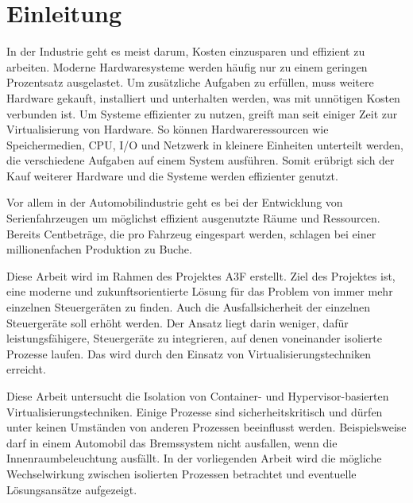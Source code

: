 \thispagestyle{empty}
\section{Einleitung}
In der Industrie geht es meist darum, Kosten einzusparen und effizient zu arbeiten. Moderne Hardwaresysteme werden häufig nur zu einem geringen Prozentsatz ausgelastet. Um zusätzliche Aufgaben zu erfüllen, muss weitere Hardware gekauft, installiert und unterhalten werden, was mit unnötigen Kosten verbunden ist. Um Systeme effizienter zu nutzen, greift man seit einiger Zeit zur Virtualisierung von Hardware. So können Hardwareressourcen wie Speichermedien, \ac{CPU}, \ac{I/O} und Netzwerk in kleinere Einheiten unterteilt werden, die verschiedene Aufgaben auf einem System ausführen. Somit erübrigt sich der Kauf weiterer Hardware und die Systeme werden effizienter genutzt. 

Vor allem in der Automobilindustrie geht es bei der Entwicklung von Serienfahrzeugen um möglichst effizient ausgenutzte Räume und Ressourcen. Bereits Centbeträge, die pro Fahrzeug eingespart werden, schlagen bei einer millionenfachen Produktion zu Buche.

Diese Arbeit wird im Rahmen des Projektes \ac{A3F} erstellt. Ziel des Projektes ist, eine moderne und zukunftsorientierte Lösung für das Problem von immer mehr einzelnen Steuergeräten zu finden. Auch die Ausfallsicherheit der einzelnen Steuergeräte soll erhöht werden. Der Ansatz liegt darin weniger, dafür leistungsfähigere, Steuergeräte zu integrieren, auf denen voneinander isolierte Prozesse laufen. Das wird durch den Einsatz von Virtualisierungstechniken erreicht. 

Diese Arbeit untersucht die Isolation von Container- und Hypervisor-basierten Virtualisierungstechniken. Einige Prozesse sind sicherheitskritisch und dürfen unter keinen Umständen von anderen Prozessen beeinflusst werden. Beispielsweise darf in einem Automobil das Bremssystem nicht ausfallen, wenn die Innenraumbeleuchtung ausfällt. In der vorliegenden Arbeit wird die mögliche Wechselwirkung zwischen isolierten Prozessen betrachtet und eventuelle Lösungsansätze aufgezeigt.


\pagebreak